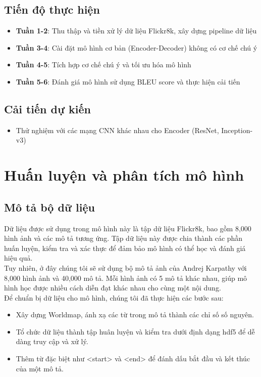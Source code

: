 \documentclass[conference]{IEEEtran}
\begin{document}
\subsection{Tiến độ thực hiện}
\begin{itemize}
    \item \textbf{Tuần 1-2}: Thu thập và tiền xử lý dữ liệu Flickr8k, xây dựng pipeline dữ liệu
    \item \textbf{Tuần 3-4}: Cài đặt mô hình cơ bản (Encoder-Decoder) không có cơ chế chú ý
    \item \textbf{Tuần 4-5}: Tích hợp cơ chế chú ý và tối ưu hóa mô hình
    \item \textbf{Tuần 5-6}: Đánh giá mô hình sử dụng BLEU score và thực hiện cải tiến
\end{itemize}

\subsection{Cải tiến dự kiến}
\begin{itemize}
    \item Thử nghiệm với các mạng CNN khác nhau cho Encoder (ResNet, Inception-v3)
\end{itemize}

\section{Huấn luyện và phân tích mô hình}
\subsection{Mô tả bộ dữ liệu}

Dữ liệu được sử dụng trong mô hình này là tập dữ liệu Flickr8k, bao gồm 8,000 hình ảnh và các mô tả tương ứng. Tập dữ liệu này được chia thành các phần huấn luyện, kiểm tra và xác thực để đảm bảo mô hình có thể học và đánh giá hiệu quả.\\
Tuy nhiên, ở đây chúng tôi sẽ sử dụng bộ mô tả ảnh của Andrej Karpathy \cite{pytorch_tutorial} với 8,000 hình ảnh và 40,000 mô tả. Mỗi hình ảnh có 5 mô tả khác nhau, giúp mô hình học được nhiều cách diễn đạt khác nhau cho cùng một nội dung.\\
Để chuẩn bị dữ liệu cho mô hình, chúng tôi đã thực hiện các bước sau:
\begin{itemize}
    \item Xây dựng Worldmap, ánh xạ các từ trong mô tả thành các chỉ số số nguyên.
    \item Tổ chức dữ liệu thành tập huân luyện và kiểm tra dưới định dạng hdf5 để dễ dàng truy cập và xử lý.
    \item Thêm từ đặc biệt như <start> và <end> để đánh dấu bắt đầu và kết thúc của một mô tả.
\end{itemize}
\end{document}
